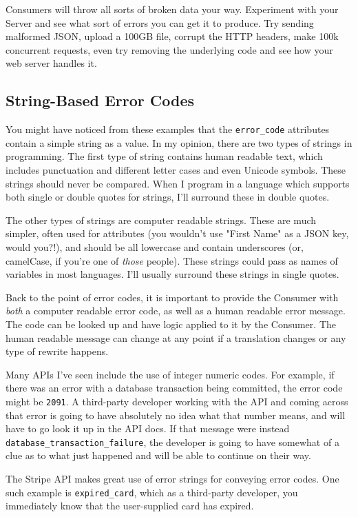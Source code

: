 \documentclass{book}
\begin{document}
Consumers will throw all sorts of broken data your way. Experiment with your Server and see what sort of errors you can get it to produce. Try sending malformed JSON, upload a 100GB file, corrupt the HTTP headers, make 100k concurrent requests, even try removing the underlying code and see how your web server handles it.

\subsection{String-Based Error Codes}

You might have noticed from these examples that the \texttt{error\_code} attributes contain a simple string as a value. In my opinion, there are two types of strings in programming. The first type of string contains human readable text, which includes punctuation and different letter cases and even Unicode symbols. These strings should never be compared. When I program in a language which supports both single or double quotes for strings, I'll surround these in double quotes.

The other types of strings are computer readable strings. These are much simpler, often used for attributes (you wouldn't use "First Name" as a JSON key, would you?!), and should be all lowercase and contain underscores (or, camelCase, if you're one of \emph{those} people). These strings could pass as names of variables in most languages. I'll usually surround these strings in single quotes.

Back to the point of error codes, it is important to provide the Consumer with \emph{both} a computer readable error code, as well as a human readable error message. The code can be looked up and have logic applied to it by the Consumer. The human readable message can change at any point if a translation changes or any type of rewrite happens.

Many APIs I've seen include the use of integer numeric codes. For example, if there was an error with a database transaction being committed, the error code might be \texttt{2091}. A third-party developer working with the API and coming across that error is going to have absolutely no idea what that number means, and will have to go look it up in the API docs. If that message were instead \texttt{database\_transaction\_failure}, the developer is going to have somewhat of a clue as to what just happened and will be able to continue on their way.

The Stripe API \cite[\#Errors]{STRIPEAPI} makes great use of error strings for conveying error codes. One such example is \texttt{expired\_card}, which as a third-party developer, you immediately know that the user-supplied card has expired.
\end{document}
